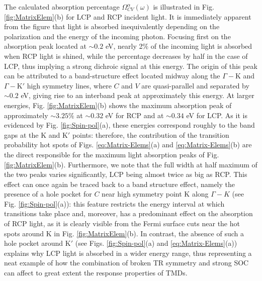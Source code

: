 \documentclass[aps,prb,showpacs,preprintnumbers,twocolumn,amsmath,amssymb]{revtex4-1}
\begin{document}
The calculated absorption percentage $\Omega^{\alpha}_{CV}(\omega)$ is illustrated in Fig. \ref{fig:MatrixElem}(b) for LCP and RCP incident light. It is immediately apparent from the figure that light is absorbed inequivalently depending on the polarization and the energy of the incoming photon. Focusing first on the absorption peak located at $\sim 0.2$ eV, nearly 2$\%$ of the incoming light is absorbed when RCP light is shined, while the percentage decreases by half in the case of LCP, thus implying a strong dichroic signal at this energy. The origin of this peak can be attributed to a band-structure effect located midway along the $\Gamma-$K and $\Gamma-$K$'$ high symmetry lines, where $C$ and $V$ are quasi-parallel and separated by $\sim 0.2$ eV, giving rise to an interband peak at approximately this energy. At larger energies, Fig. \ref{fig:MatrixElem}(b) shows the maximum absorption peak of approximately $\sim 3.25\%$ at $\sim0.32$ eV for RCP  and at $\sim 0.34$ eV for LCP. As it is evidenced by Fig. \ref{fig:Spin-pol}(a), these energies correspond roughly to the band gaps at the K and K$'$ points: therefore, the contribution of the transition probability hot spots of Figs. \ref{eq:Matrix-Elems}(a) and \ref{eq:Matrix-Elems}(b) are the direct responsible for the maximum light absorption peaks of Fig. \ref{fig:MatrixElem}(b). 
Furthermore, we note that the full width at half maximum of the two peaks varies significantly, LCP being almost twice as big as RCP. This effect can once again be traced back to a band structure effect, namely the presence of a hole pocket for $C$ near high symmetry point K along $\Gamma-K$ (see Fig. \ref{fig:Spin-pol}(a)): this feature restricts the energy interval at which transitions take place and, moreover, has a predominant effect on the absorption of RCP light, as it is clearly visible from the Fermi surface cuts near the hot spots around K in Fig. \ref{fig:MatrixElem}(b). In contrast, the absence of such a hole pocket around K$'$ (see Figs. \ref{fig:Spin-pol}(a) and \ref{eq:Matrix-Elems}(a)) explains why LCP light is absorbed in a wider energy range, thus representing a neat example of how the combination of broken TR symmetry and strong SOC can affect to great extent the response properties of TMDs.
      
\
\end{document}
